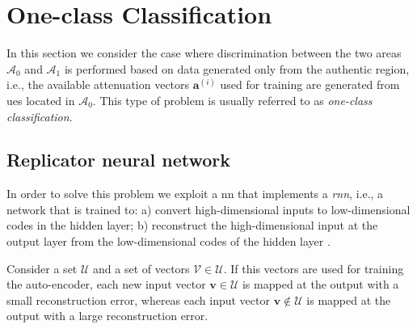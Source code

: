 \documentclass[draftcls,onecolumn,12pt]{IEEEtran}
\begin{document}

\section{One-class Classification}
\label{sec:OneClass}
In this section we consider the case where discrimination between the two areas $\mathcal{A}_0$ and $\mathcal{A}_1$ is performed based on data generated only from the authentic region, i.e., the available attenuation vectors $\bm{a}^{(i)}$ used for training are generated from \acp{ue} located in $\mathcal{A}_0$. This type of problem is usually referred to as \textit{one-class classification}. 

\subsection{Replicator neural network}
\label{sec:auto}

In order to solve this problem we exploit a \ac{nn} that implements a \textit{\ac{rnn}}, i.e., a network that is trained to: a) convert high-dimensional inputs to low-dimensional codes in the hidden layer; b) reconstruct the high-dimensional input at the output layer from the low-dimensional codes of the hidden layer \cite{Hinton-2006}.

Consider a set $\mathcal{U}$ and a set of vectors $\mathcal{V} \in \mathcal{U}$. If this vectors are used for training the auto-encoder, each new input vector $\bm{v} \in \mathcal{U}$ is mapped at the output with a small reconstruction error, whereas each input vector $\bm{v} \notin \mathcal{U} $ is mapped at the output with a large reconstruction error.
\end{document}
